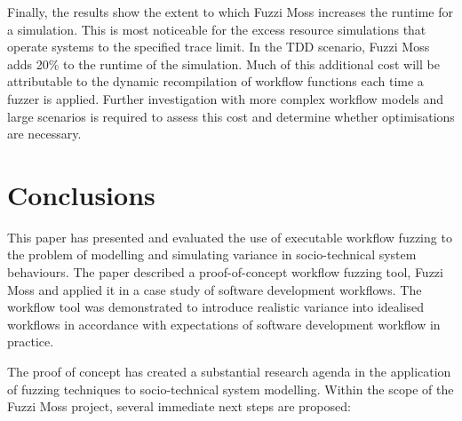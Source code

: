 \documentclass{sig-alternate}
\begin{document}
Finally, the results show the extent to which Fuzzi Moss increases the runtime
for a simulation.  This is most noticeable for the excess resource simulations
that operate systems to the specified trace limit.  In the TDD scenario, Fuzzi
Moss adds 20\% to the runtime of the simulation.  Much of this additional cost
will be attributable to the dynamic recompilation of workflow functions each
time a fuzzer is applied.  Further investigation with more complex workflow
models and large scenarios is required to assess this cost and determine whether
optimisations are necessary.



\section{Conclusions}
\label{sec:conclusions}


This paper has presented and evaluated the use of executable workflow fuzzing to
the problem of modelling and simulating variance in socio-technical system
behaviours.  The paper described a proof-of-concept workflow fuzzing tool, Fuzzi
Moss and applied it in a case study of software development workflows.  The
workflow tool was demonstrated to introduce realistic variance into idealised
workflows in accordance with expectations of software development workflow in
practice.

The proof of concept has created a substantial research agenda in the
application of fuzzing techniques to socio-technical system modelling.  Within
the scope of the Fuzzi Moss project, several immediate next steps are proposed:
\end{document}
